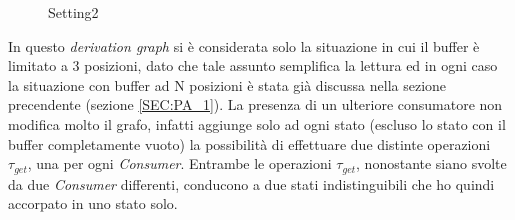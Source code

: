 \documentclass[a4paper]{article}
\begin{document}
\begin{figure}[!ht]
\centering
{}
\caption{Setting2} \label{FIG:PA2_DG}
\end{figure}In questo \textit{derivation graph} si è considerata solo la situazione in cui il buffer è limitato a 3 posizioni, dato che tale assunto semplifica la lettura ed in ogni caso la situazione con buffer ad N posizioni è stata già discussa nella sezione precendente (sezione \ref{SEC:PA_1}).
La presenza di un ulteriore consumatore non modifica molto il grafo, infatti aggiunge solo ad ogni stato (escluso lo stato con il buffer completamente vuoto) la possibilità di effettuare due distinte operazioni $\tau_{get}$, una per ogni \textit{Consumer}.
Entrambe le operazioni $\tau_{get}$, nonostante siano svolte da due \textit{Consumer} differenti, conducono a due stati indistinguibili che ho quindi accorpato in uno stato solo.
\end{document}
